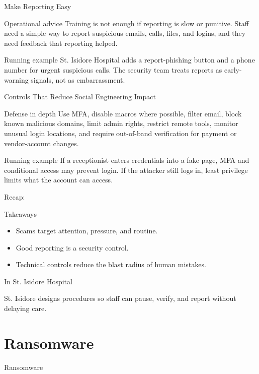 \documentclass[presentation]{beamer}
\newcommand{\sectiontitleframe}[1]{
\begin{frame}[plain,c]
\begin{center}
{\usebeamerfont{title}\usebeamercolor[fg]{title}#1}
\end{center}
\end{frame}
}
\newcommand{\scenario}{St. Isidore Hospital}
\newcommand{\takeawaysframe}[2]{
\begin{frame}[c]{Recap: \insertsection}
\begin{block}{Takeaways}
#1
\end{block}
\begin{exampleblock}{In \scenario}
#2
\end{exampleblock}
\end{frame}
}
\begin{document}
\begin{frame}[c]{Make Reporting Easy}
\begin{block}{Operational advice}
Training is not enough if reporting is slow or punitive. Staff need a simple way to report suspicious
emails, calls, files, and logins, and they need feedback that reporting helped.
\end{block}

\begin{exampleblock}{Running example}
\scenario{} adds a report-phishing button and a phone number for urgent suspicious calls. The
security team treats reports as early-warning signals, not as embarrassment.
\end{exampleblock}
\end{frame}

\begin{frame}[c]{Controls That Reduce Social Engineering Impact}
\begin{block}{Defense in depth}
Use MFA, disable macros where possible, filter email, block known malicious domains, limit admin
rights, restrict remote tools, monitor unusual login locations, and require out-of-band verification
for payment or vendor-account changes.
\end{block}

\begin{exampleblock}{Running example}
If a receptionist enters credentials into a fake page, MFA and conditional access may prevent login.
If the attacker still logs in, least privilege limits what the account can access.
\end{exampleblock}
\end{frame}

\takeawaysframe{
\begin{itemize}
    \item Scams target attention, pressure, and routine.
    \item Good reporting is a security control.
    \item Technical controls reduce the blast radius of human mistakes.
\end{itemize}
}{
St. Isidore designs procedures so staff can pause, verify, and report without delaying care.
}

\section{Ransomware}
\sectiontitleframe{Ransomware}
\end{document}
